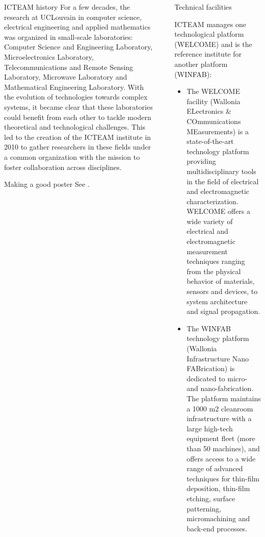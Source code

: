 \documentclass[final]{beamer}
\newlength{\sepwid}
\newlength{\onecolwid}
\begin{document}
\begin{frame}[t,fragile]
\begin{columns}[t]
\begin{column}{\onecolwid} %
  \begin{block}{ICTEAM history}
    For a few decades, the research at UCLouvain in computer science, electrical engineering and applied mathematics was organized in small-scale laboratories: Computer Science and Engineering Laboratory, Microelectronics Laboratory, Telecommunications and Remote Sensing Laboratory, Microwave Laboratory and Mathematical Engineering Laboratory.
    With the evolution of technologies towards complex systems, it became clear that these laboratories could benefit from each other to tackle modern theoretical and technological challenges.
    This led to the creation of the ICTEAM institute in 2010 to gather researchers in these fields under a common organization with the mission to foster collaboration across disciplines.
  \end{block}
  \begin{block}{Making a good poster}
    See \cite{shannon1948mathematical}.
  \end{block}
\end{column}

\begin{column}{\sepwid}\end{column} %

\begin{column}{\onecolwid} %
  \begin{block}{Technical facilities}

    ICTEAM manages one technological platform (WELCOME) and is the reference
		institute for another platform (WINFAB):
		\begin{itemize}
			\item The \alert{WELCOME} facility (Wallonia ELectronics \& COmmunications MEasurements)
				is a state-of-the-art technology platform providing multidisciplinary tools in the
				field of electrical and electromagnetic characterization. WELCOME offers a wide
				variety of electrical and electromagnetic measurement techniques ranging from
				the physical behavior of materials, sensors and devices, to system architecture
				and signal propagation.
			\item The \alert{WINFAB} technology platform (Wallonia Infrastructure Nano FABrication) is
				dedicated to micro- and nano-fabrication. The platform maintains a 1000 m2
				cleanroom infrastructure with a large high-tech equipment fleet (more than
				50 machines), and offers access to a wide range of advanced techniques for
				thin-film deposition, thin-film etching, surface patterning, micromachining and
				back-end processes.
		\end{itemize}


\end{block}
\end{column}
\end{columns}
\end{frame}
\end{document}
